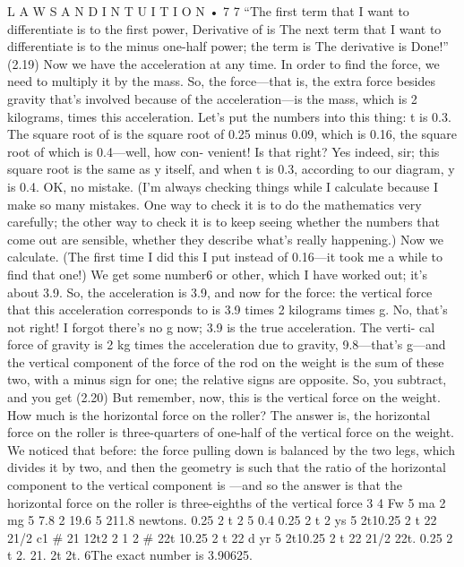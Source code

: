 \documentclass[10pt,oneside]{article}
\begin{document}
L A W S  A N D  I N T U I T I O N • 7 7 “The first term that I want to differentiate is to the first power, Derivative of is The next term that I want to differentiate is to the minus one-half power; the term is The derivative is Done!” (2.19) Now we have the acceleration at any time. In order to find the force, we need to multiply it by the mass. So, the force---that is, the extra force besides gravity that’s involved because of the acceleration---is the mass, which is 2 kilograms, times this acceleration. Let’s put the numbers into this thing: t is 0.3. The square root of is the square root of 0.25 minus 0.09, which is 0.16, the square root of which is 0.4---well, how con- venient! Is that right? Yes indeed, sir; this square root is the same as y itself, and when t is 0.3, according to our diagram, y is 0.4. OK, no mistake. (I’m always checking things while I calculate because I make so many mistakes. One way to check it is to do the mathematics very carefully; the other way to check it is to keep seeing whether the numbers that come out are sensible, whether they describe what’s really happening.) Now we calculate. (The first time I did this I put instead of 0.16---it took me a while to find that one!) We get some number6 or other, which I have worked out; it’s about 3.9. So, the acceleration is 3.9, and now for the force: the vertical force that this acceleration corresponds to is 3.9 times 2 kilograms times g. No, that’s not right! I forgot there’s no g now; 3.9 is the true acceleration. The verti- cal force of gravity is 2 kg times the acceleration due to gravity, 9.8---that’s g---and the vertical component of the force of the rod on the weight is the sum of these two, with a minus sign for one; the relative signs are opposite. So, you subtract, and you get (2.20) But remember, now, this is the vertical force on the weight. How much is the horizontal force on the roller? The answer is, the horizontal force on the roller is three-quarters of one-half of the vertical force on the weight. We noticed that before: the force pulling down is balanced by the two legs, which divides it by two, and then the geometry is such that the ratio of the horizontal component to the vertical component is ---and so the answer is that the horizontal force on the roller is three-eighths of the vertical force 3 4 Fw 5 ma 2 mg 5 7.8 2 19.6 5 211.8 newtons. 0.25 2 t 2 5 0.4 0.25 2 t 2 ys 5 2t10.25 2 t 22 21/2 c1 \# 21 12t2 2 1 2 \# 22t 10.25 2 t 22 d yr 5 2t10.25 2 t 22 21/2 22t. 0.25 2 t 2. 21. 2t 2t. 6The exact number is 3.90625.\par
\end{document}
